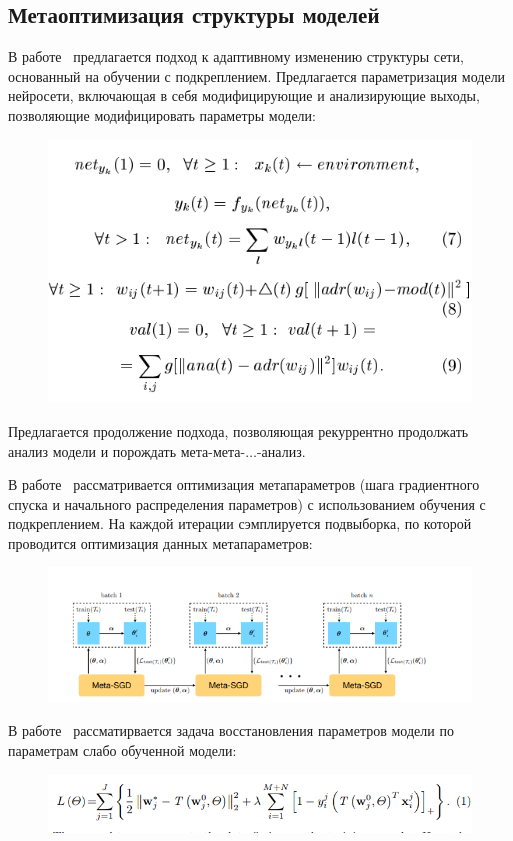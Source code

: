 \subsection*{Метаоптимизация структуры моделей}
В работе~\cite{self_rnn} предлагается подход к адаптивному изменению структуры сети, основанный на обучении с подкреплением. Предлагается параметризация модели нейросети, включающая в себя модифицирующие и анализирующие выходы, позволяющие модифицировать параметры модели:
\begin{figure}[H]
\includegraphics[width=\textwidth]{./plots/arch_review_figs/self_rnn.png}
\end{figure}
Предлагается продолжение подхода, позволяющая рекуррентно продолжать анализ модели и порождать мета-мета-$\dots$-анализ.

В работе~\cite{meta_sgd} рассматривается оптимизация метапараметров (шага градиентного спуска и начального распределения параметров) с использованием обучения с подкреплением. На каждой итерации сэмплируется подвыборка, по которой проводится оптимизация данных метапараметров:
\begin{figure}[H]
\includegraphics[width=\textwidth]{./plots/arch_review_figs/meta_sgd.png}
\end{figure}

В работе~\cite{l2l} рассматирвается задача восстановления параметров модели по параметрам слабо обученной модели:
\begin{figure}[H]
\includegraphics[width=\textwidth]{./plots/arch_review_figs/l2l.png}
\end{figure}


